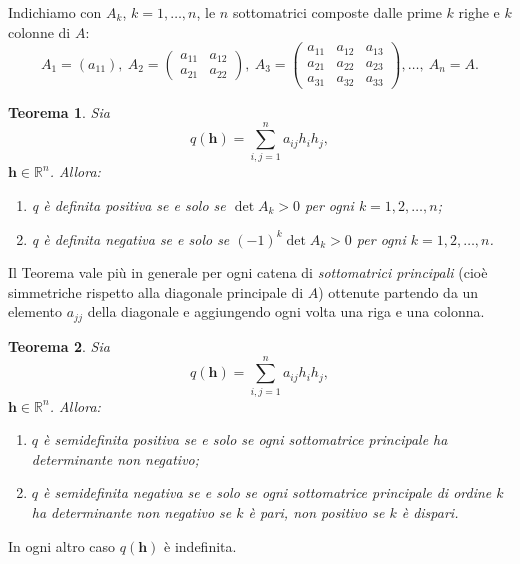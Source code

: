\documentclass[a4paper]{book}
\numberwithin{equation}{section}
\theoremstyle{plain}
\newtheorem{teor}{Teorema}[section]
\theoremstyle{definition}
\theoremstyle{remark}
\renewcommand{\vec}{\boldsymbol}
\theoremstyle{example}
\begin{document}
	Indichiamo con $A_k$, $k = 1, \dots, n$, le $n$ sottomatrici composte dalle prime $k$ righe e $k$ colonne di $A$:
	\begin{equation*}
		A_1 = (a_{11}), \ A_2 = \begin{pmatrix} a_{11} & a_{12} \\ a_{21} & a_{22} \end{pmatrix}, \ A_3 = \begin{pmatrix} a_{11} & a_{12} & a_{13} \\ a_{21} & a_{22} & a_{23} \\ a_{31} & a_{32} & a_{33} \end{pmatrix}, \dots, \ A_n = A.
	\end{equation*}

	\begin{teor}
		Sia
		\begin{equation*}
			q(\vec{h}) = \sum_{i,j = 1}^n a_{ij}h_ih_j,
		\end{equation*}
		$\vec{h} \in \mathbb{R}^n$. Allora:
		\begin{enumerate}
			\item q è definita positiva se e solo se $\det{A_k} > 0$ per ogni $k = 1, 2, \dots, n$;
			\item q è definita negativa se e solo se $(-1)^k\det{A_k} > 0$ per ogni $k = 1, 2, \dots, n$.
		\end{enumerate}
	\end{teor}

	Il Teorema vale più in generale per ogni catena di \emph{sottomatrici principali} (cioè simmetriche rispetto alla diagonale principale di $A$) ottenute partendo da un elemento $a_{jj}$ della diagonale e aggiungendo ogni volta una riga e una colonna.

	\begin{teor}
		Sia
		\begin{equation*}
			q(\vec{h}) = \sum_{i,j = 1}^na_{ij}h_ih_j,
		\end{equation*}
		$\vec{h} \in \mathbb{R}^n$. Allora:
		\begin{enumerate}
			\item $q$ è semidefinita positiva se e solo se ogni sottomatrice principale ha determinante non negativo;
			\item $q$ è semidefinita negativa se e solo se ogni sottomatrice principale di ordine $k$ ha determinante non negativo se $k$ è pari, non positivo se $k$ è dispari.
		\end{enumerate}
	\end{teor}
	In ogni altro caso $q(\vec{h})$ è indefinita.
\end{document}
